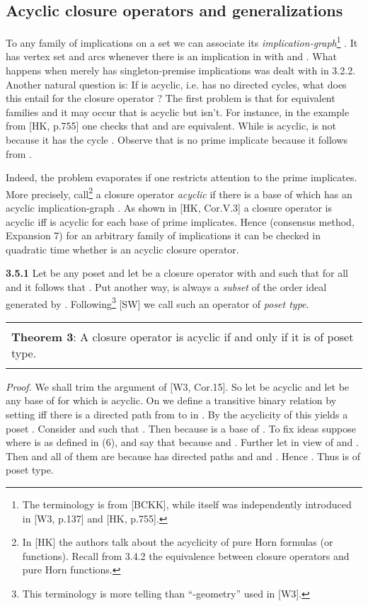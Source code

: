 \documentclass[11pt]{article}
\begin{document}
\subsection{Acyclic closure operators and generalizations}

To any family  of implications on a set  we can associate its {\it implication-graph}\footnote{The terminology is from [BCKK], while  itself was independently introduced in [W3, p.137] and [HK, p.755].} . It has vertex set  and arcs  whenever there is an implication  in  with  and . What happens when  merely has singleton-premise implications was dealt with in 3.2.2. Another natural question is: If  is acyclic, i.e. has no directed cycles, what does this entail for the closure operator  ?
The first problem is that for equivalent families  and  it may occur that  is acyclic but  isn't. For instance, in the example from [HK, p.755] one checks that  and  are equivalent. While  is acyclic,  is not because it has the cycle . Observe that  is no prime implicate because
it follows from . 

Indeed, the problem evaporates if one restricts attention to the prime implicates. More precisely, call\footnote{In [HK] the authors talk about the acyclicity of pure Horn formulas (or functions). Recall from  3.4.2 the equivalence between closure operators and pure Horn functions.} a closure operator  {\it acyclic} if there is a base  of  which has an acyclic implication-graph . As shown in [HK, Cor.V.3] a  closure operator  is acyclic iff  is acyclic for each base  of prime implicates. Hence (consensus method, Expansion 7) for an arbitrary family  of implications it can be checked in quadratic time whether  is an acyclic closure operator.

{\bf 3.5.1} Let  be any poset and let  be a closure operator with  and such that for all  and  it follows that . Put another way,  is always a {\it subset} of the order ideal  generated by . Following\footnote{This terminology is more telling than ``-geometry'' used in [W3].} [SW] we call such an operator of {\it poset type}.

\begin{tabular}{|l|} \hline \\
{\bf Theorem 3}: A closure operator  is acyclic if and only if it is of poset type.\\ \\ \hline \end{tabular}

{\it Proof.} We shall trim the argument of [W3, Cor.15]. So let  be acyclic and let  be any base of  for which  is acyclic. On  we define a transitive binary relation  by setting  iff there is a directed path from  to  in . By the acyclicity of  this yields a poset . Consider  and  such that . Then  because  is a base of . To fix ideas suppose  where  is as defined in (6), and say that  because  and . Further let  in view of  and . Then  and all of them are  because  has directed paths  and  and . Hence . Thus  is of poset type.
\end{document}
